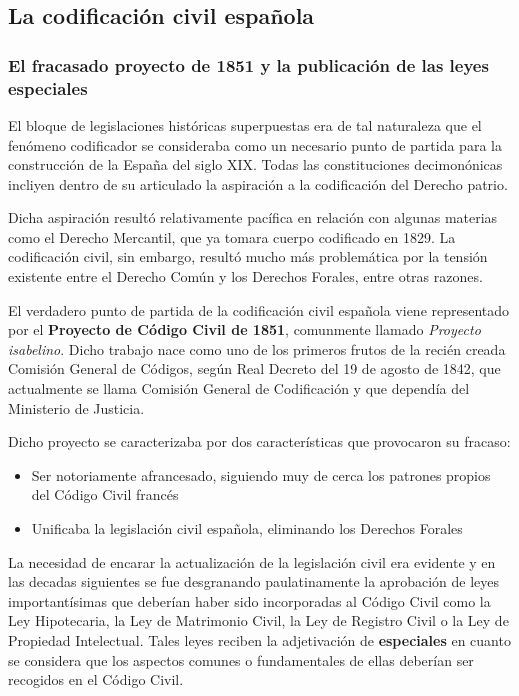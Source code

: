 \documentclass[a4paper,12pt]{report}
\begin{document}
\subsection{La codificación civil española}
\subsubsection{El fracasado proyecto de 1851 y la publicación de las leyes especiales}

El bloque de legislaciones históricas superpuestas era de tal naturaleza que el
fenómeno codificador se consideraba como un necesario punto de partida para la
construcción de la España del siglo XIX. Todas las constituciones decimonónicas
incliyen dentro de su articulado la aspiración a la codificación del Derecho
patrio.

Dicha aspiración resultó relativamente pacífica en relación con algunas materias
como el Derecho Mercantil, que ya tomara cuerpo codificado en 1829. La
codificación civil, sin embargo, resultó mucho más problemática por la tensión
existente entre el Derecho Común y los Derechos Forales, entre otras razones.

El verdadero punto de partida de la codificación civil española viene
representado por el \textbf{Proyecto de Código Civil de 1851}, comunmente
llamado \emph{Proyecto isabelino}. Dicho trabajo nace como uno de los primeros
frutos de la recién creada Comisión General de Códigos, según Real Decreto del
19 de agosto de 1842, que actualmente se llama Comisión General de Codificación
y que dependía del Ministerio de Justicia.

Dicho proyecto se caracterizaba por dos características que provocaron su
fracaso:

\begin{itemize}
\item{Ser notoriamente afrancesado, siguiendo muy de cerca los patrones propios del Código Civil francés}
\item{Unificaba la legislación civil española, eliminando los Derechos Forales}
\end{itemize}

La necesidad de encarar la actualización de la legislación civil era evidente y
en las decadas siguientes se fue desgranando paulatinamente la aprobación de
leyes importantísimas que deberían haber sido incorporadas al Código Civil como
la Ley Hipotecaria, la Ley de Matrimonio Civil, la Ley de Registro Civil o la
Ley de Propiedad Intelectual. Tales leyes reciben la adjetivación de
\textbf{especiales} en cuanto se considera que los aspectos comunes o
fundamentales de ellas deberían ser recogidos en el Código Civil.
\end{document}
